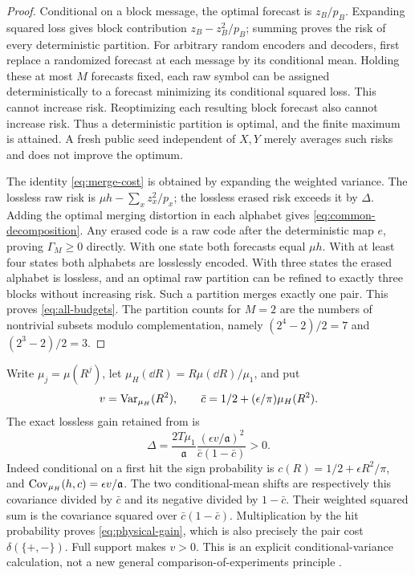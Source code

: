 \begin{proof}
Conditional on a block message, the optimal forecast is $z_B/p_B$.
Expanding squared loss gives block contribution
$z_B-z_B^2/p_B$; summing proves the risk of every deterministic partition.
For arbitrary random encoders and decoders, first replace a randomized
forecast at each message by its conditional mean. Holding these at most
$M$ forecasts fixed, each raw symbol can be assigned deterministically to
a forecast minimizing its conditional squared loss. This cannot increase
risk. Reoptimizing each resulting block forecast also cannot increase risk.
Thus a deterministic partition is optimal, and the finite maximum is
attained. A fresh public seed independent of $X,Y$ merely averages such
risks and does not improve the optimum.

The identity \eqref{eq:merge-cost} is obtained by expanding the weighted
variance. The lossless raw risk is $\mu h-\sum_x z_x^2/p_x$; the
lossless erased risk exceeds it by $\Delta$. Adding the optimal merging
distortion in each alphabet gives \eqref{eq:common-decomposition}.
Any erased code is a raw code after the deterministic map $e$, proving
$\Gamma_M\ge0$ directly. With one state both forecasts equal $\mu h$.
With at least four states both alphabets are losslessly encoded. With
three states the erased alphabet is lossless, and an optimal raw partition
can be refined to exactly three blocks without increasing risk. Such a
partition merges exactly one pair. This proves \eqref{eq:all-budgets}.
The partition counts for $M=2$ are the numbers of nontrivial subsets
modulo complementation, namely $(2^4-2)/2=7$ and $(2^3-2)/2=3$.
\end{proof}

Write $\mu_j=\mu(R^j)$, let
$\mu_H(\dd R)=R\mu(\dd R)/\mu_1$, and put
\[
 v=\operatorname{Var}_{\mu_H}(R^2),\qquad
 \bar c=1/2+(\epsilon/\pi)\mu_H(R^2).
\]
The exact lossless gain retained from \cite{A1v5} is
\begin{equation}\label{eq:physical-gain}
 \Delta=\frac{2T\mu_1}{\mathfrak a}
    \frac{(\epsilon v/\mathfrak a)^2}{\bar c(1-\bar c)}>0.
\end{equation}
Indeed conditional on a first hit the sign probability is
$c(R)=1/2+\epsilon R^2/\pi$, and
$\operatorname{Cov}_{\mu_H}(h,c)=\epsilon v/\mathfrak a$.
The two conditional-mean shifts are respectively this covariance divided
by $\bar c$ and its negative divided by $1-\bar c$.
Their weighted squared sum is the covariance squared over
$\bar c(1-\bar c)$. Multiplication by the hit probability proves
\eqref{eq:physical-gain}, which is also precisely the pair cost
$\delta(\{+,-\})$. Full support makes $v>0$. This is an explicit
conditional-variance calculation, not a new general comparison-of-experiments
principle \cite{Blackwell}.

